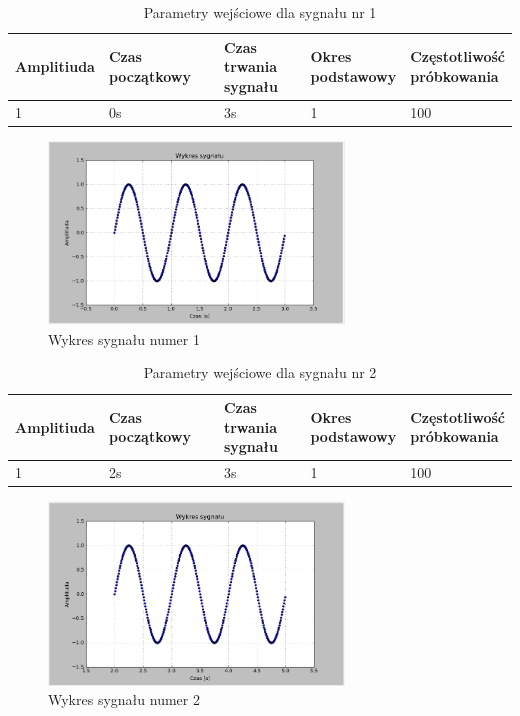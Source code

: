 \documentclass{article}
\begin{document}
{{        \begin{table}[h!]
            \centering
            \begin{tabular}{|l|l|l|l|l|}
                \hline
                Amplitiuda & Czas początkowy & \shortstack{Czas trwania \\ sygnału} & \shortstack{Okres \\ podstawowy} & \shortstack{Częstotliwość\\ próbkowania}   \\ \hline
                1 & 0s & 3s & 1 & 100           \\ \hline
            \end{tabular}
            \caption{Parametry wejściowe dla sygnału nr 1}
        \end{table}
        \begin{figure}[h!]
            \centering
            \includegraphics[width=0.7\textwidth]{img/splot1.png}
            \caption{Wykres sygnału numer 1}
        \end{figure}
        \FloatBarrier
        \begin{table}[h!]
            \centering
            \begin{tabular}{|l|l|l|l|l|}
                \hline
                Amplitiuda & Czas początkowy & \shortstack{Czas trwania \\ sygnału} & \shortstack{Okres \\ podstawowy} & \shortstack{Częstotliwość\\ próbkowania}   \\ \hline
                1 & 2s & 3s & 1 & 100           \\ \hline
            \end{tabular}
            \caption{Parametry wejściowe dla sygnału nr 2}
        \end{table}
        \begin{figure}[h!]
            \centering
            \includegraphics[width=0.7\textwidth]{img/splot2.png}
            \caption{Wykres sygnału numer 2}
        \end{figure}

}}
\end{document}
